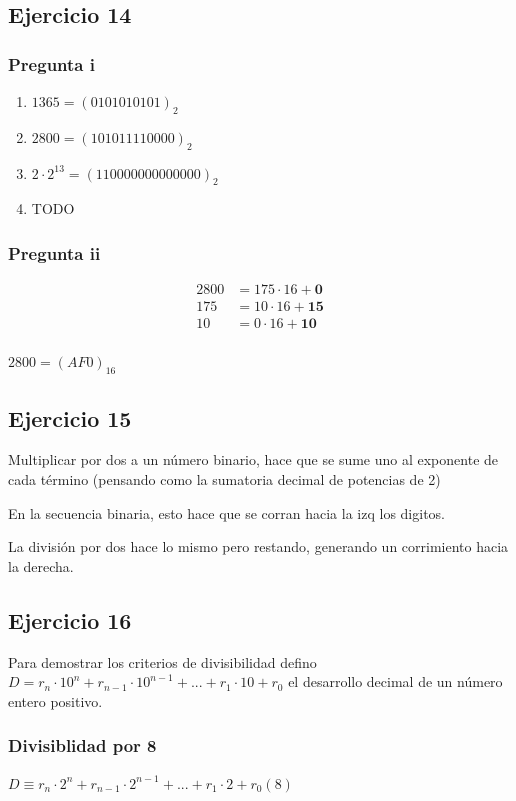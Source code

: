 \subsection{Ejercicio 14}
\subsubsection{Pregunta i}
\begin{enumerate}
    \item $ 1365 = (0101010101)_2$
    \item $ 2800 = (101011110000)_2$
    \item $ 2\cdot 2^{13} = (110000000000000)_2$
    \item TODO
\end{enumerate}

\subsubsection{Pregunta ii}
\begin{align*}
    2800 &= 175 \cdot 16 + \textbf{0} \\
    175 &= 10 \cdot 16 + \textbf{15} \\
    10 &= 0 \cdot 16 + \textbf{10} \\
\end{align*}

$ 2800 = (AF0)_{16}$

\subsection{Ejercicio 15}
Multiplicar por dos a un número binario, hace que se sume uno al exponente de cada término (pensando como la sumatoria decimal de potencias de 2)

En la secuencia binaria, esto hace que se corran hacia la izq los digitos.

La división por dos hace lo mismo pero restando, generando un corrimiento hacia la derecha.

\subsection{Ejercicio 16}
Para demostrar los criterios de divisibilidad defino $ D = r_n \cdot 10^n + r_{n-1}\cdot 10^{n-1}+...+r_1 \cdot 10 + r_0 $ el desarrollo decimal de un número entero positivo.

\subsubsection{Divisiblidad por 8}
$ D \equiv r_n \cdot 2^n + r_{n-1}\cdot 2^{n-1}+...+r_1 \cdot 2 + r_0 (8)$

